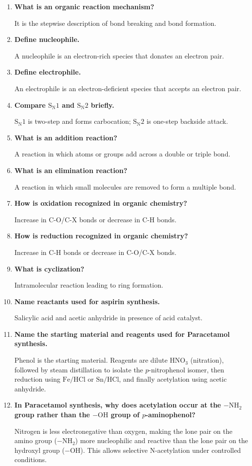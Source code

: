 \documentclass[12pt,a4paper]{article}
\newcommand{\Q}[1]{\textbf{#1}\par\noindent\ignorespaces}
\begin{document}
\begin{tcolorbox}[exambox, title={Frequently Asked / Viva Questions}]
\begin{enumerate}[topsep=0pt, label=\textbf{Q\arabic*.}, itemsep=5pt]
  \item \Q{What is an organic reaction mechanism?}
    It is the stepwise description of bond breaking and bond formation.
  \item \Q{Define nucleophile.}
    A nucleophile is an electron-rich species that donates an electron pair.
  \item \Q{Define electrophile.}
    An electrophile is an electron-deficient species that accepts an electron pair.
  \item \Q{Compare $\mathrm{S_N1}$ and $\mathrm{S_N2}$ briefly.}
    $\mathrm{S_N1}$ is two-step and forms carbocation; $\mathrm{S_N2}$ is one-step backside attack.
  \item \Q{What is an addition reaction?}
    A reaction in which atoms or groups add across a double or triple bond.
  \item \Q{What is an elimination reaction?}
    A reaction in which small molecules are removed to form a multiple bond.
  \item \Q{How is oxidation recognized in organic chemistry?}
    Increase in C-O/C-X bonds or decrease in C-H bonds.
  \item \Q{How is reduction recognized in organic chemistry?}
    Increase in C-H bonds or decrease in C-O/C-X bonds.
  \item \Q{What is cyclization?}
    Intramolecular reaction leading to ring formation.
  \item \Q{Name reactants used for aspirin synthesis.}
    Salicylic acid and acetic anhydride in presence of acid catalyst.
  \item \Q{Name the starting material and reagents used for Paracetamol synthesis.}
    Phenol is the starting material. Reagents are dilute $\mathrm{HNO_3}$ (nitration), followed by steam distillation to isolate the $p$-nitrophenol isomer, then reduction using $\mathrm{Fe/HCl}$ or $\mathrm{Sn/HCl}$, and finally acetylation using acetic anhydride.
  \item \Q{In Paracetamol synthesis, why does acetylation occur at the $-\mathrm{NH_2}$ group rather than the $-\mathrm{OH}$ group of $p$-aminophenol?}
    Nitrogen is less electronegative than oxygen, making the lone pair on the amino group ($-\mathrm{NH_2}$) more nucleophilic and reactive than the lone pair on the hydroxyl group ($-\mathrm{OH}$). This allows selective N-acetylation under controlled conditions.
\end{enumerate}
\end{tcolorbox}
\end{document}
